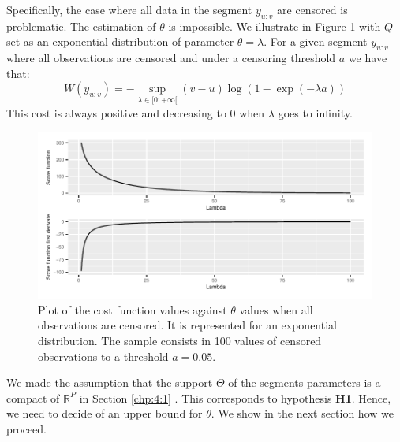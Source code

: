 Specifically, the case where all data in the segment $y_{u:v}$ are censored is problematic. The estimation of $\theta$ is impossible. We illustrate in Figure \ref{fig:onlycens} with $Q$ set as an exponential distribution of parameter $\theta = \lambda$. 
For a given segment $y_{u:v}$ where all observations are censored and under a censoring threshold $a$ we have that: 
\begin{equation} \label{chp:4:costex}
W(y_{u:v}) = -\sup_{\lambda \in [0;+\infty[}(v-u)\log(1-\exp(-\lambda a)) 
\end{equation}
This cost is always positive and decreasing to 0 when $\lambda$ goes to infinity. 
\begin{figure}[ht]
    \centering
    \includegraphics{figs/Chap4/only_cens.pdf}
    \caption{Plot of the cost function values against $\theta$ values when all observations are censored. It is represented for an exponential distribution. The sample consists in 100 values of censored observations to a threshold $a = 0.05$.}
    \label{fig:onlycens}
\end{figure}

We made the assumption that the support $\Theta$ of the segments parameters is a compact of $\mathbb{R}^P$ in Section \ref{chp:4:1} . This corresponds to hypothesis \textbf{H1}. Hence, we need to decide of an upper bound for $\theta$. We show in the next section how we proceed. 


